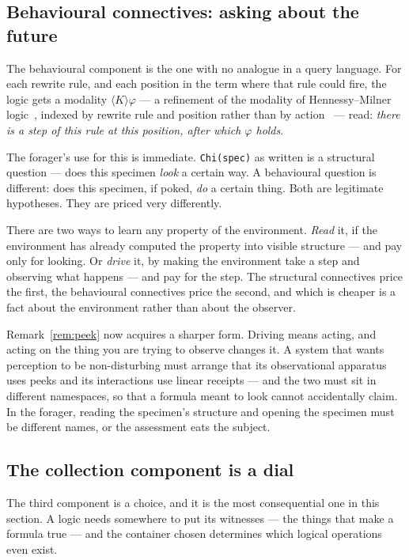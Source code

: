 \subsection{Behavioural connectives: asking about the future}

The behavioural component is the one with no analogue in a query language. For
each rewrite rule, and each position in the term where that rule could fire, the
logic gets a modality $\langle K \rangle \varphi$ --- a refinement of the
modality of Hennessy--Milner logic~\cite{HM85}, indexed by rewrite rule and
position rather than by action~\cite{Hypercube} --- read: \emph{there is a step of
this rule at this position, after which $\varphi$ holds}.

The forager's use for this is immediate. \texttt{Chi(spec)} as written is a
structural question --- does this specimen \emph{look} a certain way. A
behavioural question is different: does this specimen, if poked, \emph{do} a
certain thing. Both are legitimate hypotheses. They are priced very differently.

\begin{remark}
\label{rem:readordrive}
There are two ways to learn any property of the environment. \emph{Read} it, if
the environment has already computed the property into visible structure --- and
pay only for looking. Or \emph{drive} it, by making the environment take a step
and observing what happens --- and pay for the step. The structural connectives
price the first, the behavioural connectives price the second, and which is
cheaper is a fact about the environment rather than about the observer.
\end{remark}

Remark~\ref{rem:peek} now acquires a sharper form. Driving means acting, and
acting on the thing you are trying to observe changes it. A system that wants
perception to be non-disturbing must arrange that its observational apparatus
uses peeks and its interactions use linear receipts --- and the two must sit in
different namespaces, so that a formula meant to look cannot accidentally claim.
In the forager, reading the specimen's structure and opening the specimen must
be different names, or the assessment eats the subject.

\subsection{The collection component is a dial}

The third component is a choice, and it is the most consequential one in this
section. A logic needs somewhere to put its witnesses --- the things that make a
formula true --- and the container chosen determines which logical operations
even exist.

